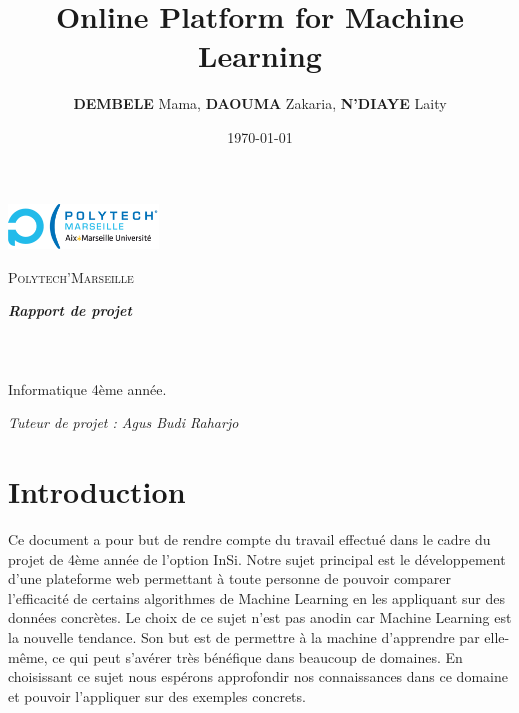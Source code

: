 \documentclass[a4paper,11pt]{article}
\title{Online Platform for Machine Learning}
\author{\textbf{DEMBELE} Mama, \textbf{DAOUMA} Zakaria, \textbf{N'DIAYE} Laity}
\date{\today}
\begin{document}
\makeatletter
  \begin{titlepage}
   \begin{flushleft}
        \includegraphics[scale=0.2, width=4cm]{logo.png}
     \end{flushleft}
       \hfill
     \vspace{2em}
   \begin{center}
   {\large \textsc{Polytech'Marseille}}
  \end{center}
  \vspace{1em}
   \begin{center}
     \Large\textbf{\textit{Rapport de projet}}\\
     \vspace{1em}
    {\large\@date\\}
    \vspace{3em}
       {\LARGE \textcolor{blue}{\textbf{\textit{\@title}}}} \\
    \vspace{3em}
        {\large \@author}\\
        \vspace{1em}
       Informatique 4ème année.
   \end{center}
\vspace{2cm}
\begin{flushleft}
\em{Tuteur de projet : Agus Budi Raharjo}
\end{flushleft}
 \vfill
 \end{titlepage}
\makeatother
\renewcommand{\contentsname}{Sommaire}
\renewcommand{\thesection}{\arabic{section}}
\setcounter{secnumdepth}{4}
\setcounter{tocdepth}{4}
\tableofcontents
\newpage
\section{Introduction}
Ce document a pour but de rendre compte du travail effectué dans le cadre du projet de 4ème année de l’option InSi. Notre sujet principal est le développement d’une plateforme web permettant à toute personne de pouvoir comparer l'efficacité de certains algorithmes  de Machine Learning en les appliquant sur des données concrètes.
Le choix de ce sujet n’est pas anodin car Machine Learning est la nouvelle tendance.
Son but est de permettre à la machine d’apprendre par elle-même, ce qui peut s’avérer très bénéfique dans beaucoup de domaines.
En choisissant ce sujet nous espérons approfondir nos connaissances dans ce domaine et pouvoir l’appliquer sur des exemples concrets.
\end{document}
